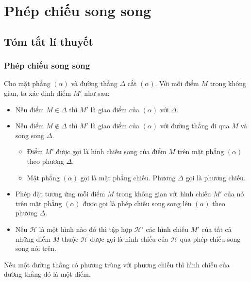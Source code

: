 \section{Phép chiếu song song}
\subsection{Tóm tắt lí thuyết}
\subsubsection{Phép chiếu song song}
Cho mặt phẳng $(\alpha )$ và đường thẳng $\Delta $ cắt $(\alpha )$. Với mỗi điểm $M$ trong không gian, ta xác định điểm $M'$ như sau:
\begin{itemize}
	\item Nếu điểm $M\in \Delta $ thì $M'$ là giao điểm của $(\alpha )$ với $\Delta $.
	\item Nếu điểm $M\notin \Delta $ thì $M'$ là giao điểm của $(\alpha )$ với đường thẳng đi qua $M$ và song song $\Delta$.
	\begin{center}
	\end{center}
	\begin{itemize}
		\item Điểm $M'$ được gọi là hình chiếu song của điểm $M$ trên mặt phẳng $(\alpha )$ theo phương $\Delta $.
		\item Mặt phẳng $(\alpha )$ gọi là mặt phẳng chiếu. Phương $\Delta $ gọi là phương chiếu.
	\end{itemize}
	\item Phép đặt tương ứng mỗi điểm $M$ trong không gian với hình chiếu $M'$ của nó trên mặt phẳng $(\alpha )$ được gọi là phép chiếu song song lên $(\alpha )$ theo phương $\Delta $.
	\item Nếu $\mathscr{H}$ là một hình nào đó thì tập hợp $\mathscr{H'}$ các hình chiếu $M'$ của tất cả những điểm $M$ thuộc $\mathscr{H}$ được gọi là hình chiếu của $\mathscr{H}$ qua phép chiếu song song nói trên.
\end{itemize}
\begin{note}
	Nếu một đường thẳng có phương trùng với phương chiếu thì hình chiếu của đường thẳng đó là một điểm.
\end{note}
